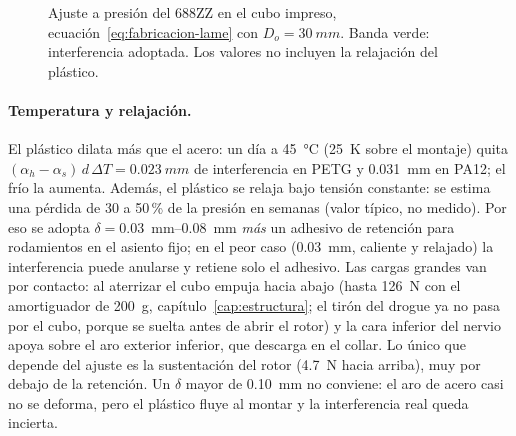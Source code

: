 \begin{figure}[H]
\centering
{}
\caption{Ajuste a presión del 688ZZ en el cubo impreso,
ecuación~\eqref{eq:fabricacion-lame} con $D_o=\SI{30}{mm}$. Banda verde: interferencia
adoptada. Los valores no incluyen la relajación del plástico.}
\label{fig:fabricacion-ajuste}
\end{figure}

\paragraph{Temperatura y relajación.} El plástico dilata más que el acero: un día a
\SI{45}{\celsius} (\SI{25}{K} sobre el montaje) quita
$(\alpha_h-\alpha_s)\,d\,\Delta T=\SI{0.023}{mm}$ de interferencia en PETG y
\SI{0.031}{mm} en PA12; el frío la aumenta. Además, el plástico se relaja bajo tensión
constante: se estima una pérdida de 30 a 50\,\% de la presión en semanas (valor típico, no
medido). Por eso se adopta $\delta=$\SIrange{0.03}{0.08}{mm} \emph{más} un adhesivo de
retención para rodamientos en el asiento fijo; en el peor caso (\SI{0.03}{mm}, caliente y
relajado) la interferencia puede anularse y retiene solo el adhesivo. Las cargas grandes
van por contacto: al aterrizar el cubo empuja hacia abajo (hasta \SI{126}{N} con el
amortiguador de \SI{200}{g}, capítulo~\ref{cap:estructura}; el tirón del drogue ya no pasa por el
cubo, porque se suelta antes de abrir el rotor) y la cara inferior del nervio
apoya sobre el aro exterior inferior, que descarga en el collar. Lo único que depende del
ajuste es la sustentación del rotor (\SI{4.7}{N} hacia arriba), muy por debajo de la
retención. Un $\delta$ mayor de \SI{0.10}{mm} no
conviene: el aro de acero casi no se deforma, pero el plástico fluye al montar y la
interferencia real queda incierta.

